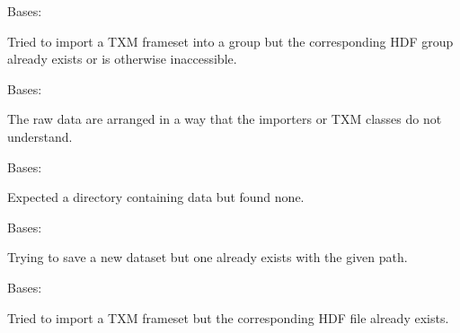 \documentclass[letterpaper,10pt,english]{sphinxmanual}
\begin{document}
\begin{fulllineitems}
\label{\detokenize{xanespy:xanespy.exceptions.CreateGroupError}}
Bases: 

Tried to import a TXM frameset into a group but the corresponding
HDF group already exists or is otherwise inaccessible.

\end{fulllineitems}


\begin{fulllineitems}
\label{\detokenize{xanespy:xanespy.exceptions.DataFormatError}}
Bases: 

The raw data are arranged in a way that the importers or TXM classes do
not understand.

\end{fulllineitems}


\begin{fulllineitems}
\label{\detokenize{xanespy:xanespy.exceptions.DataNotFoundError}}
Bases: 

Expected a directory containing data but found none.

\end{fulllineitems}


\begin{fulllineitems}
\label{\detokenize{xanespy:xanespy.exceptions.DatasetExistsError}}
Bases: 

Trying to save a new dataset but one already exists with the given
path.

\end{fulllineitems}


\begin{fulllineitems}
\label{\detokenize{xanespy:xanespy.exceptions.FileExistsError}}
Bases: 

Tried to import a TXM frameset but the corresponding HDF file
already exists.

\end{fulllineitems}
\end{document}
